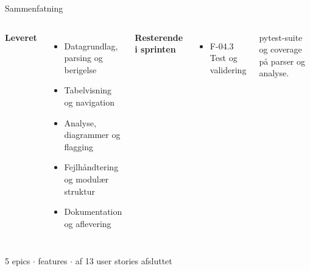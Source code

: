 \documentclass[aspectratio=169,10pt]{beamer}
\newcommand{\open}{\textcolor{muted}{\faCircle}}
\begin{document}
\begin{frame}{Sammenfatning}
  \begin{columns}[T]
    \textbf{Leveret}
    \vspace{0.3em}
    \begin{itemize}
      \item Datagrundlag, parsing og berigelse
      \item Tabelvisning og navigation
      \item Analyse, diagrammer og flagging
      \item Fejlhåndtering og modulær struktur
      \item Dokumentation og aflevering
    \end{itemize}
    \textbf{Resterende i sprinten}
    \vspace{0.3em}
    \begin{itemize}
      \item[\open] F-04.3 Test og validering
    \end{itemize}
    \vspace{0.2em}
    {\footnotesize\color{muted}pytest-suite og coverage på parser og analyse.}
  \end{columns}
  \vfill
  \centering
  {\small\color{muted}5 epics \quad$\cdot$ features \quad$\cdot$ af 13 user stories afsluttet}
\end{frame}
\end{document}
